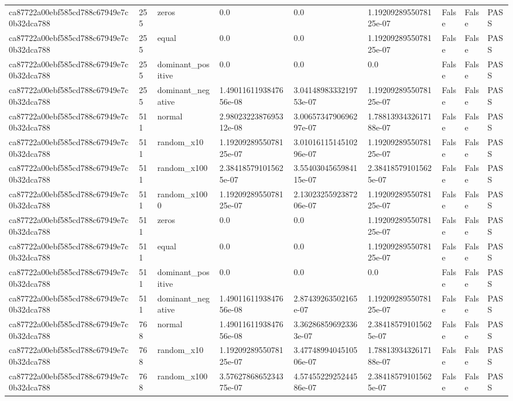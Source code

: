 \begin{tabular}{lllllllll}
ca87722a00ebf585cd788c67949e7c0b32dca788 & 255 & zeros & 0.0 & 0.0 & 1.1920928955078125e-07 & False & False & PASS \\
ca87722a00ebf585cd788c67949e7c0b32dca788 & 255 & equal & 0.0 & 0.0 & 1.1920928955078125e-07 & False & False & PASS \\
ca87722a00ebf585cd788c67949e7c0b32dca788 & 255 & dominant\_positive & 0.0 & 0.0 & 0.0 & False & False & PASS \\
ca87722a00ebf585cd788c67949e7c0b32dca788 & 255 & dominant\_negative & 1.4901161193847656e-08 & 3.0414898333219753e-07 & 1.1920928955078125e-07 & False & False & PASS \\
ca87722a00ebf585cd788c67949e7c0b32dca788 & 511 & normal & 2.9802322387695312e-08 & 3.0065734790696297e-07 & 1.7881393432617188e-07 & False & False & PASS \\
ca87722a00ebf585cd788c67949e7c0b32dca788 & 511 & random\_x10 & 1.1920928955078125e-07 & 3.0101611514510296e-07 & 1.1920928955078125e-07 & False & False & PASS \\
ca87722a00ebf585cd788c67949e7c0b32dca788 & 511 & random\_x100 & 2.384185791015625e-07 & 3.5540304565984115e-07 & 2.384185791015625e-07 & False & False & PASS \\
ca87722a00ebf585cd788c67949e7c0b32dca788 & 511 & random\_x1000 & 1.1920928955078125e-07 & 2.1302325592387206e-07 & 1.1920928955078125e-07 & False & False & PASS \\
ca87722a00ebf585cd788c67949e7c0b32dca788 & 511 & zeros & 0.0 & 0.0 & 1.1920928955078125e-07 & False & False & PASS \\
ca87722a00ebf585cd788c67949e7c0b32dca788 & 511 & equal & 0.0 & 0.0 & 1.1920928955078125e-07 & False & False & PASS \\
ca87722a00ebf585cd788c67949e7c0b32dca788 & 511 & dominant\_positive & 0.0 & 0.0 & 0.0 & False & False & PASS \\
ca87722a00ebf585cd788c67949e7c0b32dca788 & 511 & dominant\_negative & 1.4901161193847656e-08 & 2.87439263502165e-07 & 1.1920928955078125e-07 & False & False & PASS \\
ca87722a00ebf585cd788c67949e7c0b32dca788 & 768 & normal & 1.4901161193847656e-08 & 3.362868596923363e-07 & 2.384185791015625e-07 & False & False & PASS \\
ca87722a00ebf585cd788c67949e7c0b32dca788 & 768 & random\_x10 & 1.1920928955078125e-07 & 3.4774899404510506e-07 & 1.7881393432617188e-07 & False & False & PASS \\
ca87722a00ebf585cd788c67949e7c0b32dca788 & 768 & random\_x100 & 3.5762786865234375e-07 & 4.5745522925244586e-07 & 2.384185791015625e-07 & False & False & PASS \\

\end{tabular}
